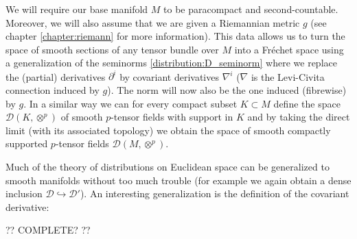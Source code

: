     We will require our base manifold $M$ to be paracompact and second-countable. Moreover, we will also assume that we are given a Riemannian metric $g$ (see chapter \ref{chapter:riemann} for more information). This data allows us to turn the space of smooth sections of any tensor bundle over $M$ into a Fr\'echet space using a generalization of the seminorms \ref{distribution:D_seminorm} where we replace the (partial) derivatives $\partial^i$ by covariant derivatives $\nabla^i$ ($\nabla$ is the Levi-Civita connection induced by $g$). The norm will now also be the one induced (fibrewise) by $g$. In a similar way we can for every compact subset $K\subset M$ define the space $\mathcal{D}(K, \otimes^p)$ of smooth $p$-tensor fields with support in $K$ and by taking the direct limit (with its associated topology) we obtain the space of smooth compactly supported $p$-tensor fields $\mathcal{D}(M, \otimes^p)$.


    Much of the theory of distributions on Euclidean space can be generalized to smooth manifolds without too much trouble (for example we again obtain a dense inclusion $\mathcal{D}\hookrightarrow\mathcal{D}'$). An interesting generalization is the definition of the covariant derivative:

    ?? COMPLETE? ??